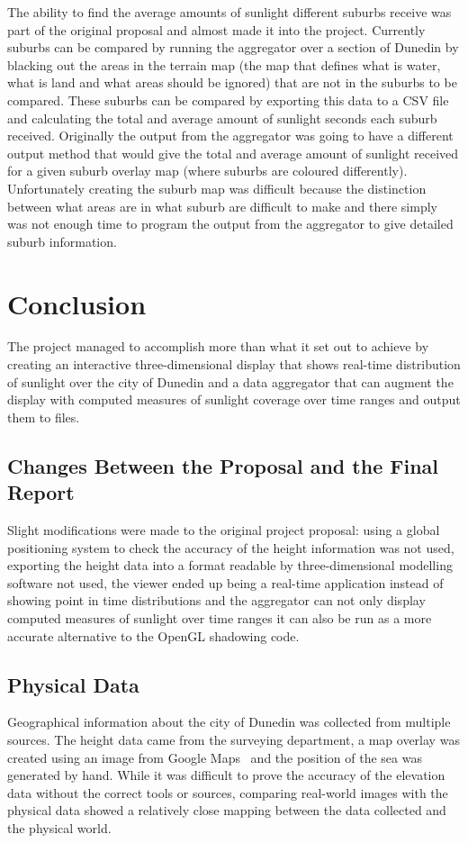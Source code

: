 \documentclass[12pt]{report}
\newcommand{\notedme}[1]{}
\begin{document}
The ability to find the average amounts of sunlight different suburbs receive was part of the original proposal and almost made it into the project. Currently suburbs can be compared by running the aggregator over a section of Dunedin by blacking out the areas in the terrain map (the map that defines what is water, what is land and what areas should be ignored) that are not in the suburbs to be compared. These suburbs can be compared by exporting this data to a CSV file and calculating the total and average amount of sunlight seconds each suburb received. Originally the output from the aggregator was going to have a different output method that would give the total and average amount of sunlight received for a given suburb overlay map (where suburbs are coloured differently). Unfortunately creating the suburb map was difficult because the distinction between what areas are in what suburb are difficult to make and there simply was not enough time to program the output from the aggregator to give detailed suburb information.

\chapter{Conclusion}
The project managed to accomplish more than what it set out to achieve by creating an interactive three-dimensional display that shows real-time distribution of sunlight over the city of Dunedin and a data aggregator that can augment the display with computed measures of sunlight coverage over time ranges and output them to files. 

\section{Changes Between the Proposal and the Final Report}
Slight modifications were made to the original project proposal: using a global positioning system to check the accuracy of the height information was not used, exporting the height data into a format readable by three-dimensional modelling software not used, the viewer ended up being a real-time application instead of showing point in time distributions and the aggregator can not only display computed measures of sunlight over time ranges it can also be run as a more accurate alternative to the OpenGL shadowing code.\notedme{Yep - good stuff! :-)}

\section{Physical Data}
Geographical information about the city of Dunedin was collected from multiple sources. The height data came from the surveying department, a map overlay was created using an image from Google Maps~\cite{gmaps} and the position of the sea was generated by hand. While it was difficult to prove the accuracy of the elevation data without the correct tools or sources, comparing real-world images with the physical data showed a relatively close mapping between the data collected and the physical world.
\end{document}
